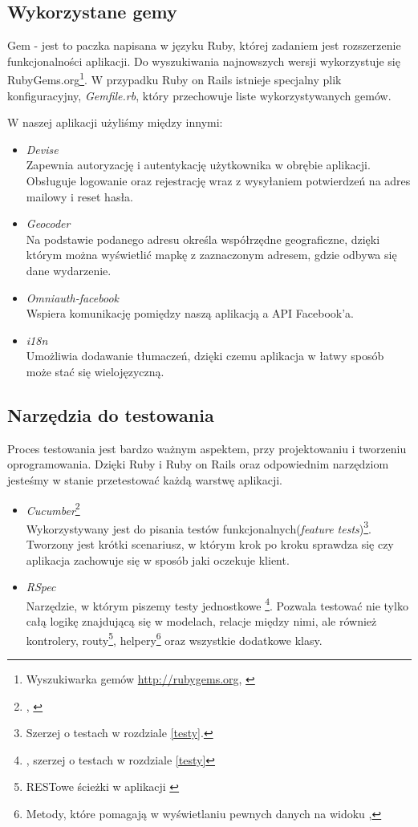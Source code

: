   \subsection{Wykorzystane gemy}
    Gem - jest to paczka napisana w języku Ruby, której zadaniem jest rozszerzenie funkcjonalności aplikacji. Do wyszukiwania najnowszych wersji wykorzystuje się RubyGems.org\footnote{Wyszukiwarka gemów \url{http://rubygems.org}, \cite{rubydoc}}. W przypadku Ruby on Rails istnieje specjalny plik konfiguracyjny, \emph{Gemfile.rb}, który przechowuje liste wykorzystywanych gemów.

    W naszej aplikacji użyliśmy między innymi:
    \begin{itemize}
      \item \emph{Devise} \\ Zapewnia autoryzację i autentykację użytkownika w obrębie aplikacji. Obsługuje logowanie oraz rejestrację wraz z wysyłaniem potwierdzeń na adres mailowy i reset hasła.
      \item \emph{Geocoder} \\ Na podstawie podanego adresu określa współrzędne geograficzne, dzięki którym można wyświetlić mapkę z zaznaczonym adresem, gdzie odbywa się dane wydarzenie.
      \item \emph{Omniauth-facebook} \\ Wspiera komunikację pomiędzy naszą aplikacją a API Facebook'a.
      \item \emph{i18n} \\ Umożliwia dodawanie tłumaczeń, dzięki czemu aplikacja w łatwy sposób może stać się wielojęzyczną.
    \end{itemize}

  \subsection{Narzędzia do testowania}
    Proces testowania jest bardzo ważnym aspektem, przy projektowaniu i tworzeniu oprogramowania. Dzięki Ruby i Ruby on Rails oraz odpowiednim narzędziom jesteśmy w stanie przetestować każdą warstwę aplikacji.

    \begin{itemize}
      \item \emph{Cucumber}\footnote{\cite{cucumber}, \cite{testing_tuesday} } \\ Wykorzystywany jest do pisania testów funkcjonalnych(\emph{feature tests})\footnote{Szerzej o testach w rozdziale \ref{testy}.}. Tworzony jest krótki scenariusz, w którym krok po kroku sprawdza się czy aplikacja zachowuje się w sposób jaki oczekuje klient.
      \item \emph{RSpec} \\ Narzędzie, w którym piszemy testy jednostkowe \footnote{\cite{rspec}, szerzej o testach w rozdziale \ref{testy}}. Pozwala testować nie tylko całą logikę znajdującą się w modelach, relacje między nimi, ale również kontrolery, routy\footnote{RESTowe ścieżki w aplikacji \cite{head_first}}, helpery\footnote{Metody, które pomagają w wyświetlaniu pewnych danych na widoku \cite{rspec},\cite{rails_guide}} oraz wszystkie dodatkowe klasy. 
    \end{itemize}

